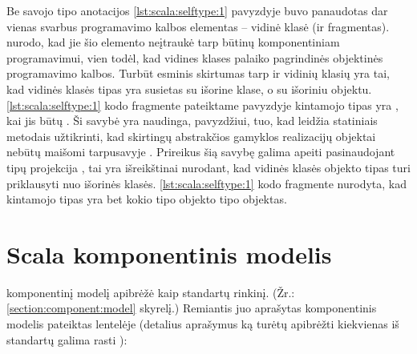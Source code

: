 Be savojo tipo anotacijos \ref{lst:scala:selftype:1} pavyzdyje buvo
panaudotas dar vienas svarbus programavimo kalbos elementas – vidinė
klasė (ir fragmentas). \cite[12]{scalable-component-abstractions}
nurodo, kad jie šio elemento neįtraukė tarp būtinų komponentiniam
programavimui, vien todėl, kad vidines klases palaiko pagrindinės
 objektinės programavimo kalbos. Turbūt esminis
skirtumas tarp  ir  vidinių klasių
yra tai, kad
 vidinės klasės tipas yra susietas su išorine klase,
o  su išoriniu objektu. \ref{lst:scala:selftype:1}
kodo fragmente pateiktame pavyzdyje kintamojo  tipas
yra , kai  jis būtų
. Ši savybė yra naudinga, pavyzdžiui, tuo, kad 
leidžia statiniais metodais užtikrinti, kad skirtingų abstrakčios
gamyklos  realizacijų objektai nebūtų maišomi
tarpusavyje \cite[36]{scala-design-patterns}. Prireikus šią savybę
galima apeiti pasinaudojant tipų projekcija ,
tai yra išreikštinai nurodant, kad vidinės klasės objekto tipas
turi priklausyti nuo išorinės klasės. \ref{lst:scala:selftype:1}
kodo fragmente nurodyta, kad kintamojo  tipas yra
bet kokio  tipo objekto  tipo objektas.

\section{Scala komponentinis modelis}

\cite[37]{heineman2001component} komponentinį modelį apibrėžė kaip
standartų rinkinį. (Žr.: \ref{section:component:model} skyrelį.)
Remiantis juo aprašytas  komponentinis modelis
pateiktas lentelėje (detalius aprašymus ką turėtų apibrėžti
kiekvienas iš standartų galima rasti
\cite[38-44]{heineman2001component}):


